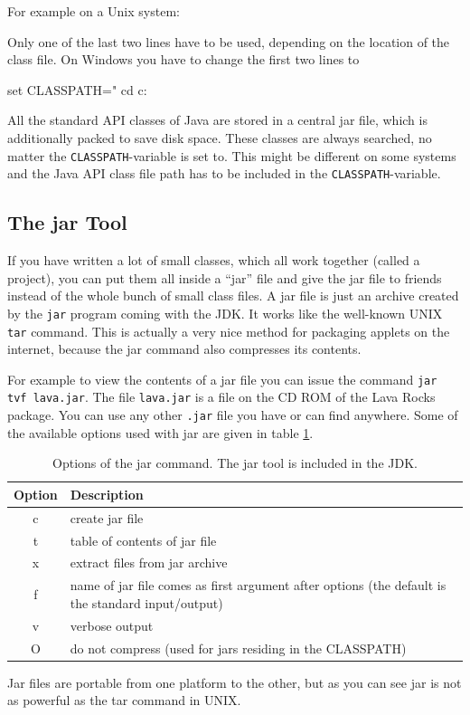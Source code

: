 For example on a Unix system:
Only one of the last two lines have to be used, depending on the
location of the class file. On Windows you have to change the first
two lines to
\begin{sverbatim}
  set CLASSPATH="%
  cd c:\
\end{sverbatim}

All the standard API classes of Java are stored in a central jar
file, which is additionally packed to save disk space. These classes
are always searched, no matter the \verb|CLASSPATH|-variable is set to.
This might be different on some systems and the Java API class file
path has to be included in the \verb|CLASSPATH|-variable. 


\subsection{The jar Tool}
If you have written a lot of small classes, which all work together
(called a project), you
can put them all inside a ``jar'' file and give the jar file
to friends instead of the whole bunch of small class files.
A jar file is just an archive created by the \verb|jar| program 
coming with the JDK. It works like the well-known UNIX \verb|tar|
command. This is actually a very nice method for packaging
applets on the internet, because the jar command also compresses
its contents. 

For example to view the contents of a jar file you can issue the command
\verb|jar tvf lava.jar|. The file \verb|lava.jar| is a file on the
CD ROM of the Lava Rocks package. You can use any other \verb|.jar| file
you have or can find anywhere. Some of the
available options used with jar are given in table \ref{tab:JarOptions}.
\begin{table}[htbp]
  \begin{center}
    \begin{tabular}{cp{}}
      Option & Description \\\hline
      c & create jar file\\
      t & table of contents of jar file\\
      x & extract files from jar archive\\
      f & name of jar file comes as first argument after options (the
          default is the standard input/output) \\
      v & verbose output \\
      O & do not compress (used for jars residing in the CLASSPATH)\\
    \end{tabular}
    \caption{Options of the jar command. The jar tool is included in the JDK.}
    \label{tab:JarOptions}
  \end{center}
\end{table}
Jar files are portable from one platform to the other, but as you can 
see jar is not as powerful as the tar command in UNIX.


